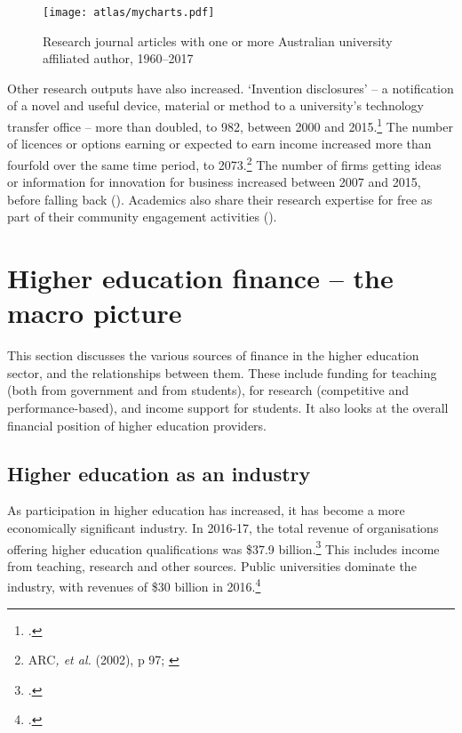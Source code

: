 \documentclass{grattan}
\begin{document}
    \begin{figure} %
    \caption{Research journal articles with one or more Australian university affiliated author, 1960--2017}\label{fig:research-journal-articles-with-one-or-more-australian-university-affiliated-author-19602017}
    \texttt{[image: atlas/mycharts.pdf]}
    \end{figure}
Other research outputs have also increased. `Invention disclosures' -- a notification of a novel and useful device, material or method to a university's technology transfer office -- more than doubled, to 982, between 2000 and 2015.\footcites[][218]{Larkins2011australianhighere}[][table~1]{DIIS2017nationalsurveyof} The number of licences or options earning or expected to earn income increased more than fourfold over the same time period, to 2073.\footnote{ARC\emph{, et al.} (2002), p 97; \textcite[][table~1]{DIIS2017nationalsurveyof}} The number of firms getting ideas or information for innovation for business increased between 2007 and 2015, before falling back (). Academics also share their research expertise for free as part of their community engagement activities ().

%
\chapter{Higher education finance -- the macro picture}\label{chap:higher-education-finance-the-macro-picture}

%


This section discusses the various sources of finance in the higher education sector, and the relationships between them. These include funding for teaching (both from government and from students), for research (competitive and performance-based), and income support for students. It also looks at the overall financial position of higher education providers.

%
\section{Higher education as an industry}\label{sec:higher-education-as-an-industry}

As participation in higher education has increased, it has become a more economically significant industry. In 2016-17, the total revenue of organisations offering higher education qualifications was \$37.9 billion.\footcite[][45]{TEQSA2018teqsasriskassess} This includes income from teaching, research and other sources. Public universities dominate the industry, with revenues of \$30 billion in 2016.\footcite[][]{DepartmentofEducationandTraining2017finance2016finan}
\end{document}
